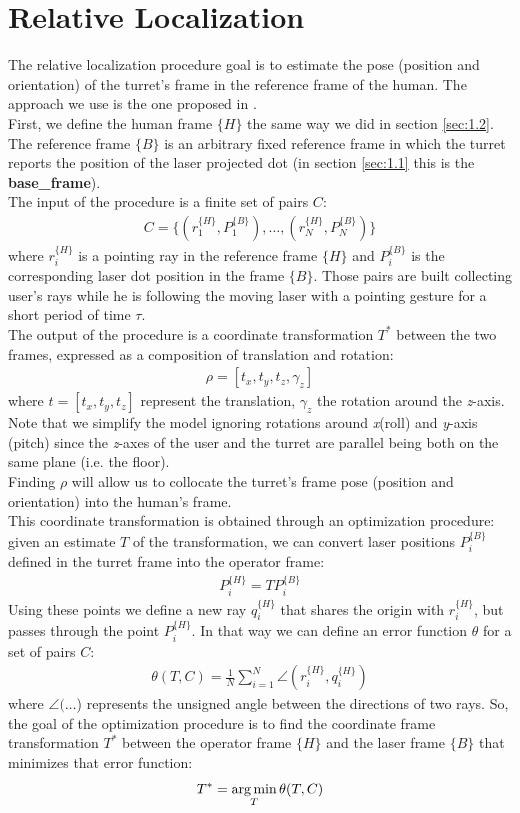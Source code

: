 \section{Relative Localization} \label{sec:relloc}
The relative localization procedure goal is to estimate the pose (position and orientation) of the turret's frame in the reference frame of the human. The approach we use is the one proposed in \cite{gromov2018robot}.\\
First, we define the human frame $\{H\}$ the same way we did in section \ref{sec:1.2}. The reference frame $\{B\}$ is an arbitrary fixed reference frame in which the turret reports the position of the laser projected dot (in section \ref{sec:1.1} this is the \textbf{base\_frame}).\\ The input of the procedure is a finite set of pairs $C$:
\begin{align}
    C=\{(r_1^{\{H\}},P_1^{\{B\}}), \dots,(r_N^{\{H\}},P_N^{\{B\}})\}\nonumber
\end{align}
where $r_i^{\{H\}}$ is a pointing ray in the reference frame $\{H\}$ and $P_i^{\{B\}}$ is the corresponding laser dot position in the frame $\{B\}$. Those pairs are built collecting user's rays while he is following the moving laser with a pointing gesture for a short period of time $\tau$.\\
The output of the procedure is a coordinate transformation $T^*$ between the two frames, expressed as a composition of translation and rotation: 
\begin{align}
	\rho = [t_x, t_y, t_z, \gamma_z] \nonumber
\end{align}
where $t=[t_x, t_y, t_z]$ represent the translation, $\gamma_z$ the rotation around the \emph{z}-axis. Note that we simplify the model ignoring rotations around \emph{x}(roll) and \emph{y}-axis (pitch)  since the \emph{z}-axes of the user and the turret are parallel being both on the same plane (i.e. the floor).\\ Finding $\rho$ will allow us to collocate the turret's frame pose (position and orientation) into the human's frame.\\
This coordinate transformation is obtained through an optimization procedure: given an estimate $T$ of the transformation, we can convert laser positions $P_i^{\{B\}}$ defined in the turret frame into the operator frame:
\begin{align}
	P_i^{\{H\}}= TP_i^{\{B\}} \nonumber
\end{align}
Using these points we define a new ray $q_i^{\{H\}}$ that shares the origin with $r_i^{\{H\}}$, but passes through the point $P_i^{\{H\}}$. In that way we can define an error function $\theta$ for a set of pairs $C$:
\begin{align}\label{eq:error}
	\theta(T,C)=\frac{1}{N}\sum_{i=1}^N\angle(r_i^{\{H\}},q_i^{\{H\}})
\end{align}
where $\angle(\dots$) represents the unsigned angle between the directions of two rays. So, the goal of the optimization procedure is to find the coordinate frame transformation $T^*$ between the operator frame $\{H\}$ and the laser frame $\{B\}$ that minimizes that error function:
\begin{align}
	T^*=\operatorname*{arg\,min}_T\theta(T,C)
\end{align}
